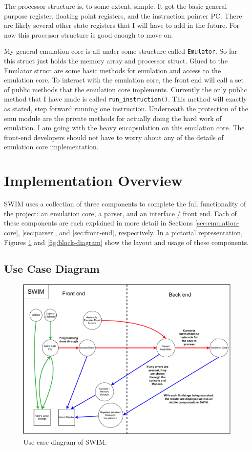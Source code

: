 \documentclass[
    paper=letter,
    parskip=half,
    fontsize=12pt,
    titlepage=firstiscover,
    toc=bibliography,
    numbers=endperiod
]{scrartcl}
\let\oldsection\section
\renewcommand{\section}{\newpage\oldsection}
\begin{document}
The processor structure is, to some extent, simple. It got the basic
general purpose register, floating point registers, and the instruction
pointer PC. There are likely several other state registers that I will
have to add in the future. For now this processor structure is good
enough to move on.

My general emulation core is all under some structure called
\texttt{Emulator}. So far this struct just holds the memory array and
processor struct. Glued to the Emulator struct are some basic methods
for emulation and access to the emulation core. To interact with the
emulation core, the front end will call a set of public methods that the
emulation core implements. Currently the only public method that I have
made is called \texttt{run\_instruction()}. This method will exactly as
stated, step forward running one instruction. Underneath the protection
of the emu module are the private methods for actually doing the hard
work of emulation. I am going with the heavy encapsulation on this
emulation core. The front-end developers should not have to worry about
any of the details of emulation core implementation.

\section{Implementation Overview}

SWIM uses a collection of three components to complete the full
functionality of the project: an emulation core, a parser, and an
interface / front end. Each of these components are each explained in
more detail in Sections \ref{sec:emulation-core}, \ref{sec:parser}, and
\ref{sec:front-end}, respectively. In a pictorial representation,
Figures \ref{fig:use-case-diagram} and \ref{fig:block-diagram} show the
layout and usage of these components.

\subsection{Use Case Diagram}

\begin{figure}[H]
    \includegraphics[width=\textwidth]{use-case-diagram}
    \caption{Use case diagram of SWIM.}
    \label{fig:use-case-diagram}
\end{figure}
\end{document}
